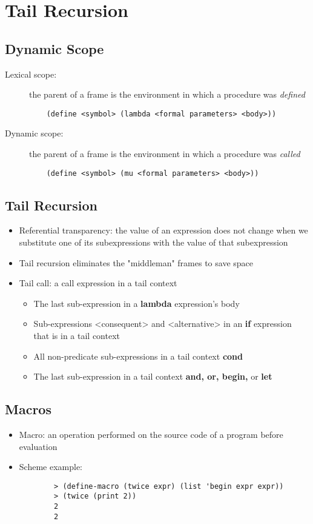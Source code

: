 \chapter{Tail Recursion}

\section{Dynamic Scope}
\begin{description}
    \item [Lexical scope:] the parent of a frame is the environment in which a procedure was \emph{defined}
    \begin{verbatim}
    (define <symbol> (lambda <formal parameters> <body>))
    \end{verbatim}
    \item [Dynamic scope:] the parent of a frame is the environment in which a procedure was \emph{called}
    \begin{verbatim}
    (define <symbol> (mu <formal parameters> <body>))
    \end{verbatim}
\end{description}

\section{Tail Recursion}
\begin{itemize}
    \item Referential transparency: the value of an expression does not change when we substitute one of its subexpressions with the value of that subexpression
    \item Tail recursion eliminates the "middleman" frames to save space
    \item Tail call: a call expression in a tail context
    \begin{itemize}
        \item The last sub-expression in a \textbf{lambda} expression's body
        \item Sub-expressions <consequent> and <alternative> in an \textbf{if} expression that is in a tail context
        \item All non-predicate sub-expressions in a tail context \textbf{cond}
        \item The last sub-expression in a tail context \textbf{and, or, begin,} or \textbf{let}
    \end{itemize}
\end{itemize}

\section{Macros}
\begin{itemize}
    \item Macro: an operation performed on the source code of a program before evaluation
    \item Scheme example:
    \begin{verbatim}
        > (define-macro (twice expr) (list 'begin expr expr))
        > (twice (print 2))
        2
        2
    \end{verbatim}
\end{itemize}